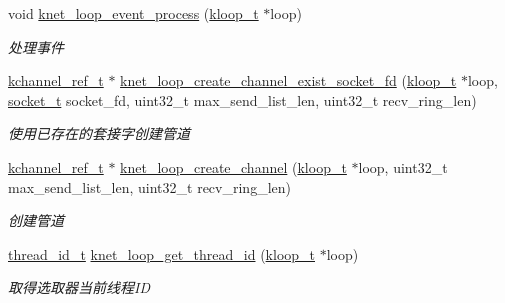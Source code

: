 \begin{DoxyCompactItemize}
void \hyperlink{a00076_a80c9fb216de2e04a4f301ccb4ca7a6f5_a80c9fb216de2e04a4f301ccb4ca7a6f5}{knet\+\_\+loop\+\_\+event\+\_\+process} (\hyperlink{a00056_a97fc76209a58362019f1ded9169e397f_a97fc76209a58362019f1ded9169e397f}{kloop\+\_\+t} $\ast$loop)
\begin{DoxyCompactList}\small\item\em 处理事件 \end{DoxyCompactList}\item 
\hyperlink{a00056_a3b7e82599367eade261456f60ebe2cd9_a3b7e82599367eade261456f60ebe2cd9}{kchannel\+\_\+ref\+\_\+t} $\ast$ \hyperlink{a00117_gaddfd5a2709d0c26ada8a2dd3fd6a5b62_gaddfd5a2709d0c26ada8a2dd3fd6a5b62}{knet\+\_\+loop\+\_\+create\+\_\+channel\+\_\+exist\+\_\+socket\+\_\+fd} (\hyperlink{a00056_a97fc76209a58362019f1ded9169e397f_a97fc76209a58362019f1ded9169e397f}{kloop\+\_\+t} $\ast$loop, \hyperlink{a00056_a0d9e0afbf02fb6ed6c5b1415dce51b05_a0d9e0afbf02fb6ed6c5b1415dce51b05}{socket\+\_\+t} socket\+\_\+fd, uint32\+\_\+t max\+\_\+send\+\_\+list\+\_\+len, uint32\+\_\+t recv\+\_\+ring\+\_\+len)
\begin{DoxyCompactList}\small\item\em 使用已存在的套接字创建管道 \end{DoxyCompactList}\item 
\hyperlink{a00056_a3b7e82599367eade261456f60ebe2cd9_a3b7e82599367eade261456f60ebe2cd9}{kchannel\+\_\+ref\+\_\+t} $\ast$ \hyperlink{a00117_gac1f9a4848c06c2a6a2723d7b991b4394_gac1f9a4848c06c2a6a2723d7b991b4394}{knet\+\_\+loop\+\_\+create\+\_\+channel} (\hyperlink{a00056_a97fc76209a58362019f1ded9169e397f_a97fc76209a58362019f1ded9169e397f}{kloop\+\_\+t} $\ast$loop, uint32\+\_\+t max\+\_\+send\+\_\+list\+\_\+len, uint32\+\_\+t recv\+\_\+ring\+\_\+len)
\begin{DoxyCompactList}\small\item\em 创建管道 \end{DoxyCompactList}\item 
\hyperlink{a00056_ad0ada5642d10ce71bdd90816182f9b79_ad0ada5642d10ce71bdd90816182f9b79}{thread\+\_\+id\+\_\+t} \hyperlink{a00076_a352ae2febcbb9264ef1d5043618bcb80_a352ae2febcbb9264ef1d5043618bcb80}{knet\+\_\+loop\+\_\+get\+\_\+thread\+\_\+id} (\hyperlink{a00056_a97fc76209a58362019f1ded9169e397f_a97fc76209a58362019f1ded9169e397f}{kloop\+\_\+t} $\ast$loop)
\begin{DoxyCompactList}\small\item\em 取得选取器当前线程\+I\+D \end{DoxyCompactList}\item 

\end{DoxyCompactItemize}
